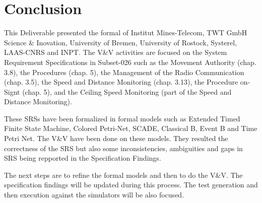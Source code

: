 \documentclass{template/openetcs_article}
\begin{document}







\newpage



\section{Conclusion}

This Deliverable presented the formal \vv of Institut
Mines-Telecom, TWT GmbH Science \& Inovation, University of Bremen, University of Rostock, Systerel, LAAS-CNRS and INPT. 
The V\&V activities are focused on the System Requirement Specifications in
Subset-026 such as the Movement Authority (chap. 3.8), the Procedures (chap. 5),
the Management of the Radio Communication (chap. 3.5), the Speed and Distance
Monitoring (chap. 3.13), the Procedure on-Signt (chap. 5), and the Ceiling Speed Monitoring (part of the Speed and Distance Monitoring). 

These SRSs have been formalized in formal models such as  Extended Timed Finite
State Machine, Colored Petri-Net, SCADE, Classical B, Event B and Time Petri Net. 
The V\&V have been done on these models. They resulted
the correctness of the SRS but also
some inconsistencies, ambiguities and gaps in SRS being
repported in the Specification Findings.

The next steps are to refine the formal models and then to do the V\&V.
The specification findings will be updated during this process.
The test generation and then execution against the
simulators will be also focused.





%



%
\end{document}
